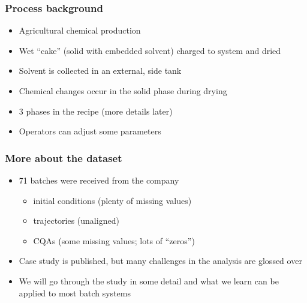 \begin{frame}\frametitle{Process background}

\begin{itemize}
	\item	Agricultural chemical production
	
	\item	Wet ``cake'' (solid with embedded solvent) charged to system and dried
	
	\item	Solvent is collected in an external, side tank
	
	\item	Chemical changes occur in the solid phase during drying 
	
	\item	3 phases in the recipe (more details later)

	\item	Operators can adjust some parameters
\end{itemize}

\end{frame}

\begin{frame}\frametitle{More about the dataset}


\begin{itemize}
	\item	71 batches were received from the company
	
	\begin{itemize}
		\item	initial conditions (plenty of missing values)
		
		\item	trajectories (unaligned)
		
		\item	CQAs (some missing values; lots of ``zeros'')
	\end{itemize}
	
	\item	Case study is published, but many challenges in the analysis are glossed over
	
	\item	We will go through the study in some detail and what we learn {\color{myOrange}can be applied to most batch systems}
\end{itemize}

\end{frame}

